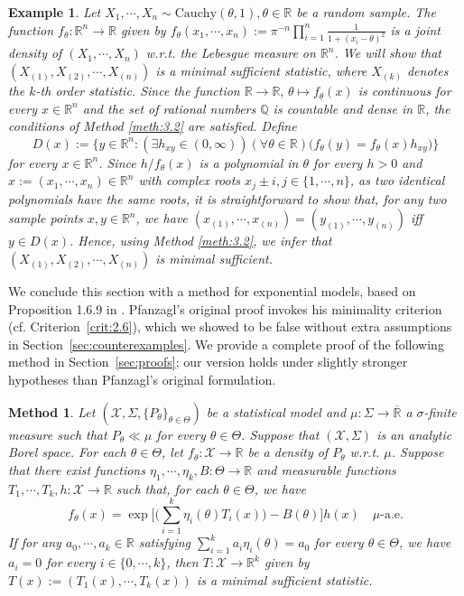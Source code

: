 \documentclass[12pt]{article}
\newtheorem{example}{Example}[section]
\newtheorem{method}{Method}[section]
\begin{document}
\begin{example}
\label{ex:4.5}
Let $X_1,\cdots, X_n\sim \text{Cauchy}(\theta ,1),\theta\in\mathbb{R}$ be a random sample. The function $f_\theta :\mathbb{R}^n\to \mathbb{R}$ given by $f_\theta (x_1,\cdots, x_n):=\pi ^{-n}\prod_{i=1}^n\frac{1}{1+(x_i-\theta )^2}$ is a joint density of $(X_1,\cdots, X_n)$ w.r.t. the Lebesgue measure on $\mathbb{R}^n$. We will show that $(X_{(1)},X_{(2)},\cdots, X_{(n)})$ is a minimal sufficient statistic, where $X_{(k)}$ denotes the $k$-th order statistic. Since the function $\mathbb{R}\to \mathbb{R},\,\theta \mapsto f_\theta (x)$ is continuous for every $x\in\mathbb{R}^n$ and the set of rational numbers $\mathbb{Q}$ is countable and dense in $\mathbb{R}$, the conditions of Method \ref{meth:3.2} are satisfied. Define
$$D(x ):=\big\{y\in \mathbb{R}^n:(\exists h_{xy}\in (0,\infty ))(\forall \theta \in \mathbb{R})\big(f_\theta (y)=f_\theta (x)h_{xy}\big)\big\}$$
for every $x\in\mathbb{R}^n$. Since $h/f_\theta (x)$ is a polynomial in $\theta$ for every $h>0$ and $x:=(x_1,\cdots,x_n)\in\mathbb{R}^n$ with complex roots $x_j\pm i,j\in \{1,\cdots,n\}$, as two identical polynomials have the same roots, it is straightforward to show that, for any two sample points $x,y\in\mathbb{R}^n$, we have $(x_{(1)},\cdots, x_{(n)})=(y_{(1)},\cdots, y_{(n)})$ iff $y\in D(x)$. Hence, using Method \ref{meth:3.2}, we infer that $(X_{(1)},X_{(2)},\cdots, X_{(n)})$ is minimal sufficient.
\end{example}
We conclude this section with a method for exponential models, based on Proposition 1.6.9 in \cite{Pfanzagl1994}. Pfanzagl's original proof invokes his minimality criterion (cf. Criterion~\ref{crit:2.6}), which we showed to be false without extra assumptions in Section~\ref{sec:counterexamples}. We provide a complete proof of the following method in Section~\ref{sec:proofs}; our version holds under slightly stronger hypotheses than Pfanzagl's original formulation.


\begin{method}
\label{meth:3.3}
Let $(\mathcal{X},\Sigma ,\{P_\theta\}_{\theta\in\Theta })$ be a statistical model and $\mu:\Sigma\to\overline{\mathbb{R}}$ a $\sigma$-finite measure such that $P_\theta \ll \mu$ for every $\theta\in\Theta$. Suppose that $(\mathcal{X},\Sigma )$ is an analytic Borel space. For each $\theta\in\Theta$, let $f_\theta :\mathcal{X}\to \mathbb{R}$ be a density of $P_\theta $ w.r.t. $\mu$. Suppose that there exist functions $\eta _1,\cdots,\eta _k,B:\Theta \to \mathbb{R}$ and measurable functions $T_1,\cdots ,T_k,h:\mathcal{X}\to \mathbb{R}$ such that, for each $\theta\in\Theta$, we have
$$f_\theta (x)=\exp \big[\big(\sum _{i=1}^k\eta_i (\theta )T_i(x)\big)-B(\theta )\big]h(x)\quad \mu\text{-a.e.}$$
If for any $a_0,\cdots,a_k\in\mathbb{R}$ satisfying $\sum _{i=1}^ka_i\eta_i (\theta )=a_0$ for every $\theta\in\Theta$, we have $a_i=0$ for every $i\in \{0,\cdots, k\}$, then $T:\mathcal{X}\to \mathbb{R}^k$ given by $T(x):=(T_1(x),\cdots, T_k(x))$ is a minimal sufficient statistic.
\end{method}
\end{document}
